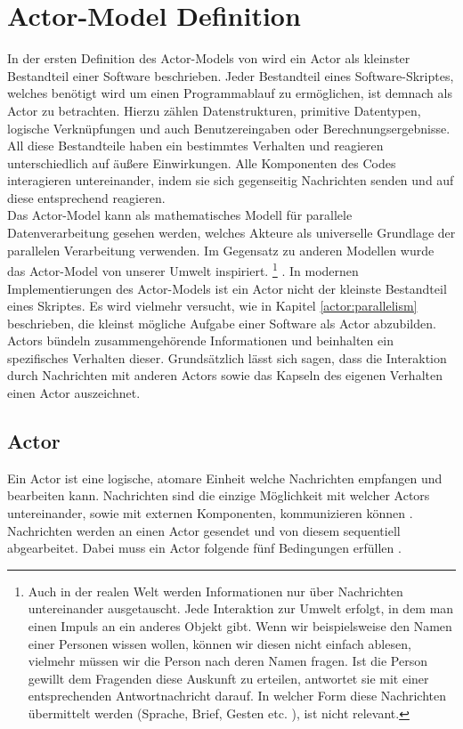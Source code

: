 \section{Actor-Model Definition}\label{actor:definition}
In der ersten Definition des Actor-Models von \cite{hewitt1973session} wird ein Actor als kleinster Bestandteil einer Software beschrieben. Jeder Bestandteil eines Software-Skriptes, welches benötigt wird um einen Programmablauf zu ermöglichen, ist demnach als Actor zu betrachten. Hierzu zählen Datenstrukturen, primitive Datentypen, logische Verknüpfungen und auch Benutzereingaben oder Berechnungsergebnisse. All diese Bestandteile haben ein bestimmtes Verhalten und reagieren unterschiedlich auf äußere Einwirkungen. Alle Komponenten des Codes interagieren untereinander, indem sie sich gegenseitig Nachrichten senden und auf diese entsprechend reagieren.\\
Das Actor-Model kann als mathematisches Modell für parallele Datenverarbeitung gesehen werden, welches Akteure als universelle Grundlage der parallelen Verarbeitung verwenden. Im Gegensatz zu anderen Modellen wurde das Actor-Model von unserer Umwelt inspiriert.
\footnote{Auch in der realen Welt werden Informationen nur über Nachrichten untereinander ausgetauscht. Jede Interaktion zur Umwelt erfolgt, in dem man einen Impuls an ein anderes Objekt gibt. Wenn wir beispielsweise den Namen einer Personen wissen wollen, können wir diesen nicht einfach ablesen, vielmehr müssen wir die Person nach deren Namen fragen. Ist die Person gewillt dem Fragenden diese Auskunft zu erteilen, antwortet sie mit einer entsprechenden Antwortnachricht darauf. In welcher Form diese Nachrichten übermittelt werden (Sprache, Brief, Gesten etc. ), ist nicht relevant.} \citep{Vernon2015ReactiveAkka} . In modernen Implementierungen des Actor-Models ist ein Actor nicht der kleinste Bestandteil eines Skriptes. Es wird vielmehr versucht, wie in Kapitel \ref{actor:parallelism} beschrieben, die kleinst mögliche Aufgabe einer Software als Actor abzubilden. \\
Actors bündeln zusammengehörende Informationen und beinhalten ein spezifisches Verhalten dieser. Grundsätzlich lässt sich sagen, dass die Interaktion durch Nachrichten mit anderen Actors sowie das Kapseln des eigenen Verhalten einen Actor auszeichnet.

\subsection{Actor}
Ein Actor ist eine logische, atomare Einheit welche Nachrichten empfangen und bearbeiten kann. Nachrichten sind die einzige Möglichkeit mit welcher Actors untereinander, sowie mit externen Komponenten, kommunizieren können \citep{Agha1985ConcurrentParallelism}. Nachrichten werden an einen Actor gesendet und von diesem sequentiell abgearbeitet. Dabei muss ein Actor folgende fünf Bedingungen erfüllen \citep{Agha1985ConcurrentParallelism}.

